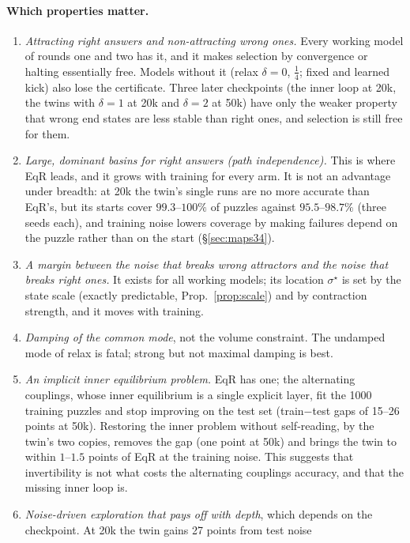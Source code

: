 \documentclass[11pt]{article}
\theoremstyle{definition}
\begin{document}
\paragraph{Which properties matter.}
\begin{enumerate}[leftmargin=*,itemsep=1pt]
\item \emph{Attracting right answers and non-attracting wrong ones.} Every working model of rounds one and two has it, and it makes selection
by convergence or halting essentially free. Models without it (relax $\delta=0$, $\frac14$; fixed and learned kick) also lose the certificate.
Three later checkpoints (the inner loop at 20k, the twins with $\delta=1$ at 20k and $\delta=2$ at 50k) have only the weaker property that
wrong end states are less stable than right ones, and selection is still free for them.
\item \emph{Large, dominant basins for right answers (path independence).} This is where EqR leads, and it grows with training for every arm.
It is not an advantage under breadth: at 20k the twin's single runs are no more accurate than EqR's, but its starts cover $99.3$--$100\%$ of
puzzles against $95.5$--$98.7\%$ (three seeds each), and training noise lowers coverage by making failures depend on the puzzle rather
than on the start (\S\ref{sec:maps34}).
\item \emph{A margin between the noise that breaks wrong attractors and the noise that breaks right ones.} It exists for all working models; its
location $\sigma^\star$ is set by the state scale (exactly predictable, Prop.~\ref{prop:scale}) and by contraction strength, and it moves with training.
\item \emph{Damping of the common mode}, not the volume constraint. The undamped mode of relax is fatal; strong but not maximal damping is best.
\item \emph{An implicit inner equilibrium problem.} EqR has one; the alternating couplings, whose inner equilibrium is a single explicit layer,
fit the 1000 training puzzles and stop improving on the test set (train$-$test gaps of 15--26 points at 50k). Restoring the inner problem
without self-reading, by the twin's two copies, removes the gap (one point at 50k) and brings the twin to within $1$--$1.5$ points of EqR at the
training noise. This suggests that invertibility is not what costs the alternating couplings accuracy, and that the missing inner loop is.
\item \emph{Noise-driven exploration that pays off with depth}, which depends on the checkpoint. At 20k the twin gains 27 points from test noise

\end{enumerate}
\end{document}
